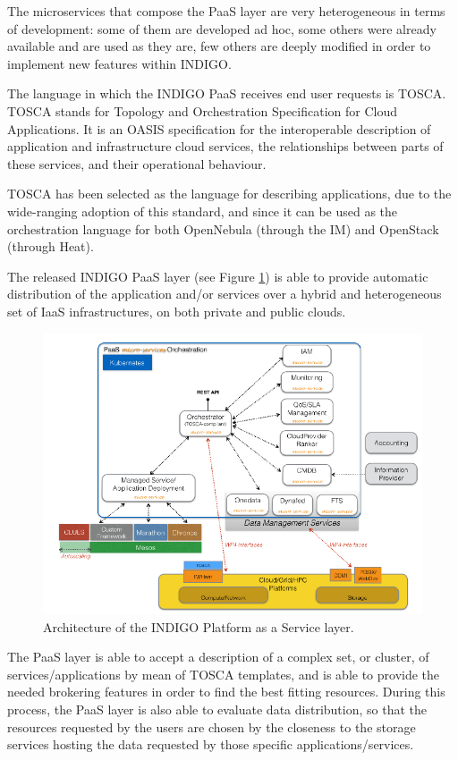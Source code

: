 \documentclass{article}
\begin{document}
The microservices that compose the PaaS layer are very heterogeneous in terms of development: some of them are developed ad hoc, some others were already available and are used as they are, few others are deeply modified in order to implement new features within INDIGO. 

The language in which the INDIGO PaaS receives end user requests is TOSCA\cite{TOSCA}. TOSCA stands for Topology and Orchestration Specification for Cloud Applications. It is an OASIS specification for the interoperable description of application and infrastructure cloud services, the relationships between parts of these services, and their operational behaviour. 

TOSCA has been selected as the language for describing applications, due to the wide-ranging adoption of this standard, and since it can be used as the orchestration language for both OpenNebula (through the IM) and OpenStack (through Heat).

The released INDIGO PaaS layer (see Figure \ref{fig:3}) is able to provide automatic distribution of the application and/or services over a hybrid and heterogeneous set of IaaS infrastructures, on both private and public clouds. 



\begin{figure}
  \centering
  \includegraphics[width=\textwidth]{./figs/Figure3.pdf}
  \caption{Architecture of the INDIGO Platform as a Service layer.}
  \label{fig:3}
\end{figure}



The PaaS layer is able to accept a description of a complex set, or cluster, of services/applications by mean of TOSCA templates, and is able to provide the needed brokering features in order to find the best fitting resources. During this process, the PaaS layer is also able to evaluate data distribution, so that the resources requested by the users are chosen by the closeness to the storage services hosting the data requested by those specific applications/services.
\end{document}
